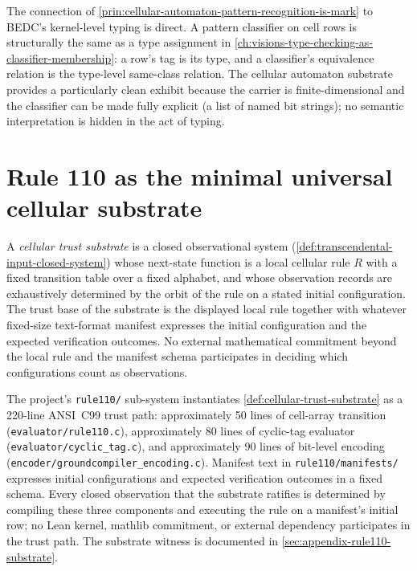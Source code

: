 \begin{remark}
\label{rem:cellular-automaton-classifier-vs-typing}
The connection of \autoref{prin:cellular-automaton-pattern-recognition-is-mark} to BEDC's kernel-level typing is direct. A pattern classifier on cell rows is structurally the same as a type assignment in \autoref{ch:visions-type-checking-as-classifier-membership}: a row's tag is its type, and a classifier's equivalence relation is the type-level same-class relation. The cellular automaton substrate provides a particularly clean exhibit because the carrier is finite-dimensional and the classifier can be made fully explicit (a list of named bit strings); no semantic interpretation is hidden in the act of typing.
\end{remark}

\section{Rule 110 as the minimal universal cellular substrate}
\label{sec:cellular-automaton-reading-rule110-minimal}

\begin{definition}
\label{def:cellular-trust-substrate}
A \emph{cellular trust substrate} is a closed observational system (\autoref{def:transcendental-input-closed-system}) whose next-state function is a local cellular rule $R$ with a fixed transition table over a fixed alphabet, and whose observation records are exhaustively determined by the orbit of the rule on a stated initial configuration. The trust base of the substrate is the displayed local rule together with whatever fixed-size text-format manifest expresses the initial configuration and the expected verification outcomes. No external mathematical commitment beyond the local rule and the manifest schema participates in deciding which configurations count as observations.
\end{definition}

\begin{example}
\label{ex:cellular-trust-substrate-rule110}
The project's \texttt{rule110/} sub-system instantiates \autoref{def:cellular-trust-substrate} as a 220-line ANSI~C99 trust path: approximately 50 lines of cell-array transition (\texttt{evaluator/rule110.c}), approximately 80 lines of cyclic-tag evaluator (\texttt{evaluator/cyclic\_tag.c}), and approximately 90 lines of bit-level encoding (\texttt{encoder/groundcompiler\_encoding.c}). Manifest text in \texttt{rule110/manifests/} expresses initial configurations and expected verification outcomes in a fixed schema. Every closed observation that the substrate ratifies is determined by compiling these three components and executing the rule on a manifest's initial row; no Lean kernel, mathlib commitment, or external dependency participates in the trust path. The substrate witness is documented in \autoref{sec:appendix-rule110-substrate}.
\end{example}

